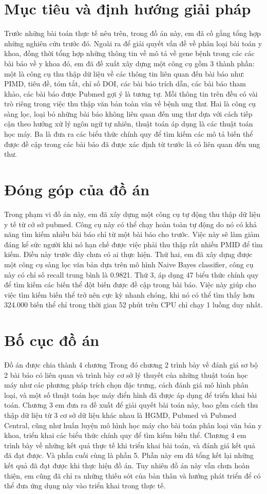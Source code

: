 \documentclass[../DoAn.tex]{subfiles}
\begin{document}
\section{Mục tiêu và định hướng giải pháp}
Trước những bài toán thực tế nêu trên, trong đồ án này, em đã cố gắng tổng hợp những nghiên cứu trước đó. Ngoài ra để giải quyết vấn đề về phân loại bài toán y khoa, đồng thời tổng hợp những thông tin về mô tả về gene bệnh trong các các bài báo về y khoa đó, em đã đề xuất xây dựng một công cụ gồm 3 thành phần: một là công cụ thu thập dữ liệu về các thông tin liên quan đến bài báo như: PIMD, tiêu đề, tóm tắt, chỉ số DOI, các bài báo trích dẫn, các bài báo tham khảo, các bài báo được Pubmed gợi ý là tương tự. Mỗi thông tin trên đều có vài trò riêng trong việc thu thập văn bản toàn văn về bệnh ung thư. Hai là công cụ sàng lọc, loại bỏ những bài báo không liên quan đến ung thư dựa với cách tiếp cận theo hướng xử lý ngôn ngữ tự nhiên, thuật toán áp dụng là các thuật toán học máy. Ba là đưa ra các biểu thức chính quy để tìm kiếm các mô tả biến thể được đề cập trong các bài báo đã được xác định từ trước là có liên quan đến ung thư.

\section{Đóng góp của đồ án}
Trong phạm vi đồ án này, em đã xây dựng một công cụ tự động thu thập dữ liệu y tế từ cớ sở pubmed. Công cụ này có thể chạy hoàn toàn tự động do nó có khả năng tìm kiếm nhiều bài báo chỉ từ một bài báo cho trước. Việc này sẽ làm giảm đáng kể sức người khi nó hạn chế được việc phải thu thập rất nhiều PMID để tìm kiếm. Điều này trước đây chưa có ai thực hiện. Thứ hai, em đã xây dựng được một công cụ sàng lọc văn bản dựa trên mô hình Naive Bayes classifier, công cụ này có chỉ số recall trung bình là 0.9821. Thứ 3, áp dụng 47 biểu thức chính quy để tìm kiếm các biến thể đột biến được đề cập trong bài báo. Việc này giúp cho việc tìm kiếm biến thể trở nên cực kỳ nhanh chóng, khi nó có thể tìm thấy hơn 324.000 biến thể chỉ trong thời gian 52 phút trên CPU chỉ chạy 1 luồng duy nhất.


\section{Bố cục đồ án}
Đồ án được chia thành 4 chương Trong đó chương 2 trình bày về đánh giá sơ bộ 2 bài báo có liên quan và trình bày cơ sở lý thuyết của những thuật toán học máy như các phương pháp trích chọn đặc trưng, cách đánh giá mô hình phân loại, và một số thuật toán học máy điển hình đã được áp dụng để triển khai bài toán. Chương 3 em đưa ra đề xuất để giải quyết bài toán này, bao gồm cách thu thập dữ liệu từ 3 cơ sở dữ liệu khác nhau là HGMD, Pubmed và Pubmed Central, cũng như huấn luyện mô hình học máy cho bài toán phân loại văn bản y khoa, triển khai các biểu thức chính quy để tìm kiếm biến thể. Chương 4 em trình bày về những kết quả thực tế khi triển khai bài toán, và đánh giá kết quả đã đạt được.  Và phần cuối cùng là phần 5. Phần này em đã tổng kết lại những kết quả đã đạt được khi thực hiện đồ án. Tuy nhiên đồ án này vẫn chưa hoàn thiện, em cũng đã chỉ ra những thiếu sót của bản thân và hướng phát triển để có thể đưa ứng dụng này vào triển khai trong thực tế.
\end{document}
